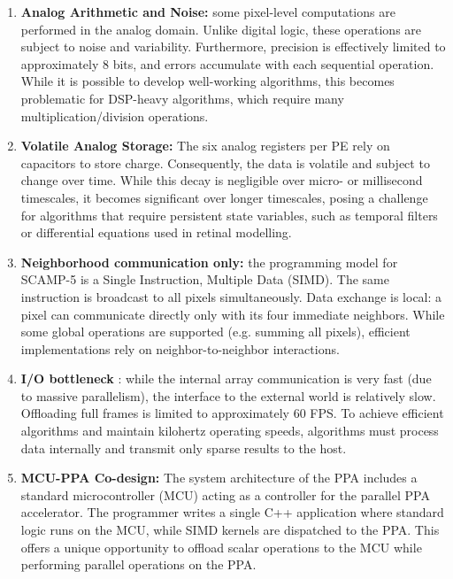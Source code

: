 \documentclass{article}
\begin{document}
\begin{enumerate}[itemsep=4pt, topsep=4pt]
    \item \textbf{Analog Arithmetic and Noise:} some pixel-level computations are performed in the analog domain. Unlike digital logic, these operations are subject to noise and variability. Furthermore, precision is effectively limited to approximately 8 bits, and errors accumulate with each sequential operation. While it is possible to develop well-working algorithms, this becomes problematic for DSP-heavy algorithms, which require many multiplication/division operations.
    \item \textbf{Volatile Analog Storage:} The six analog registers per PE rely on capacitors to store charge. Consequently, the data is volatile and subject to change over time. While this decay is negligible over micro- or millisecond timescales, it becomes significant over longer timescales, posing a challenge for algorithms that require persistent state variables, such as temporal filters or differential equations used in retinal modelling.
    \item \textbf{Neighborhood communication only:} the programming model for SCAMP-5 is a Single Instruction, Multiple Data (SIMD). The same instruction is broadcast to all pixels simultaneously. Data exchange is local: a pixel can communicate directly only with its four immediate neighbors. While some global operations are supported (e.g. summing all pixels), efficient implementations rely on neighbor-to-neighbor interactions.
    \item \textbf{I/O bottleneck} : while the internal array communication is very fast (due to massive parallelism), the interface to the external world is relatively slow. Offloading full frames is limited to approximately 60 FPS. To achieve efficient algorithms and maintain kilohertz operating speeds, algorithms must process data internally and transmit only sparse results to the host.
    \item \textbf{MCU-PPA Co-design:} The system architecture of the PPA includes a standard microcontroller (MCU) acting as a controller for the parallel PPA accelerator. The programmer writes a single C++ application where standard logic runs on the MCU, while SIMD kernels are dispatched to the PPA. This offers a unique opportunity to offload scalar operations to the MCU while performing parallel operations on the PPA.
    
\end{enumerate}
\end{document}

